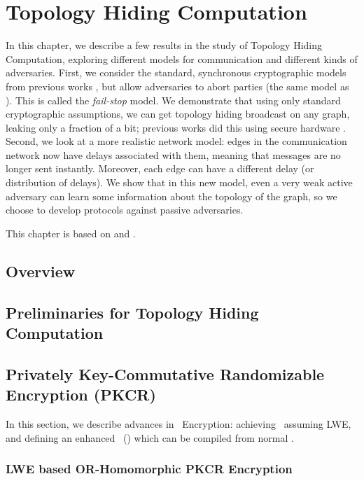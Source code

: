 \chapter{Topology Hiding Computation}
In this chapter, we describe a few results in the study of Topology Hiding Computation, exploring different models for communication and different kinds of adversaries. First, we consider the standard, synchronous cryptographic models from previous works \cite{EC:AkaMor17,C:AkaLaVMor17}, but allow adversaries to abort parties (the same model as \cite{BBMM18}). This is called the \emph{fail-stop} model. We demonstrate that using only standard cryptographic assumptions, we can get topology hiding broadcast on any graph, leaking only a fraction of a bit; previous works did this using secure hardware \cite{BBMM18}. Second, we look at a more realistic network model: edges in the communication network now have delays associated with them, meaning that messages are no longer sent instantly. Moreover, each edge can have a different delay (or distribution of delays). We show that in this new model, even a very weak active adversary can learn some information about the topology of the graph, so we choose to develop protocols against passive adversaries.

This chapter is based on \cite{LLMMMT18} and \cite{LLMMMT20}.

\section{Overview}


\section{Preliminaries for Topology Hiding Computation}\label{sec:prelim}



\section{Privately Key-Commutative Randomizable Encryption (PKCR)}
In this section, we describe advances in \PKCR~Encryption: achieving \PKCR~assuming LWE, and defining an enhanced \PKCR~(\PKCR*) which can be compiled from normal \PKCR.

\subsection{LWE based OR-Homomorphic PKCR Encryption}\label{sec:lwe-pkcr}


